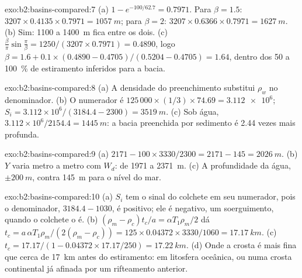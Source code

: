 \begin{solution}{exo:b2:basins-compared:7}
(a) $1 - e^{-100/62.7} = 0.7971$. Para $\beta = 1.5$: $3207\times0.4135\times0.7971 =
\qty{1057}{m}$; para $\beta = 2$: $3207\times0.6366\times0.7971 = \qty{1627}{m}$. (b) Sim: 1100 a
\qty{1400}{m} fica entre os dois. (c) $\frac{\beta}{\pi}\sin\frac{\pi}{\beta} = 1250/(3207\times0.7971)
= 0.4890$, logo $\beta = 1.6 + 0.1\times(0.4890 - 0.4705)/(0.5204 - 0.4705) = 1.64$, dentro dos
50 a \qty{100}{\percent} de estiramento inferidos para a bacia.
\end{solution}

\begin{solution}{exo:b2:basins-compared:8}
(a) A densidade do preenchimento substitui $\rho_w$ no denominador. (b) O numerador é
$125\,000\times(1/3)\times74.69 = \num{3.112e6}$; $S_i = 3.112\times10^{6}/(3184.4 - 2300) =
\qty{3519}{m}$. (c) Sob água, $3.112\times10^{6}/2154.4 = \qty{1445}{m}$: a bacia preenchida por sedimento
é 2.44 vezes mais profunda.
\end{solution}

\begin{solution}{exo:b2:basins-compared:9}
(a) $2171 - 100\times3330/2300 = 2171 - 145 = \qty{2026}{m}$. (b) $Y$ varia metro a metro
com $W_d$: de 1971 a \qty{2371}{m}. (c) A profundidade da água, $\pm\qty{200}{m}$, contra
\qty{145}{m} para o nível do mar.
\end{solution}

\begin{solution}{exo:b2:basins-compared:10}
(a) $S_i$ tem o sinal do colchete em seu numerador, pois o denominador, $3184.4 - 1030$, é
positivo; ele é negativo, um soerguimento, quando o colchete o é. (b) $(\rho_m - \rho_c)t_c/a =
\alpha T_1\rho_m/2$ dá $t_c = a\,\alpha T_1\rho_m/(2(\rho_m - \rho_c)) = 125\times0.04372\times
3330/1060 = \qty{17.17}{km}$. (c) $t_c = 17.17/(1 - 0.04372\times17.17/250) = \qty{17.22}{km}$.
(d) Onde a crosta é mais fina que cerca de \qty{17}{km} antes do estiramento: em litosfera oceânica,
ou numa crosta continental já afinada por um rifteamento anterior.
\end{solution}

